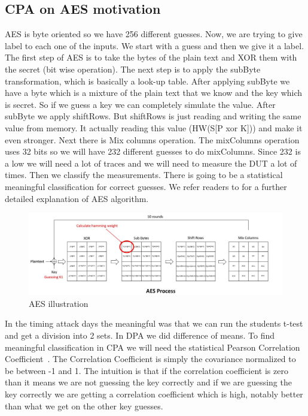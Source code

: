\subsection{CPA on AES motivation}

AES \cite{anderson1998serpent} is byte oriented so we have 256 different guesses. Now, we are trying to
give label to each one of the inputs. We start with a guess and then we give it
a label. The first step of AES is to take the bytes of the plain text and XOR
them with the secret (bit wise operation). The next step is to apply the subByte
transformation, which is basically a look-up table. After applying subByte we
have a byte which is a mixture of the plain text that we know and the key which
is secret. So if we guess a key we can completely simulate the value. After
subByte we apply shiftRows. But shiftRows is just reading and writing the same
value from memory. It actually reading this value (HW(S[P xor K])) and make it
even stronger. Next there is Mix columns operation. The mixColumns operation
uses 32 bits so we will have 232 different guesses to do mixColumns. Since 232
is a low we will need a lot of traces and we will need to measure the DUT a lot
of times. Then we classify the measurements. There is going to be a statistical
meaningful classification for correct guesses. We refer readers to \cite{AESDescription} 
for a further detailed explanation of AES algorithm.

\begin{figure}[!ht]
    \centering
    \includegraphics[width=1.0\textwidth]{images/chapter8/aes_process.jpg}
    \caption{AES illustration} \label{c8_aes:fig}
\end{figure}

In the timing attack days the meaningful was that we can run the students t-test
and get a division into 2 sets. In DPA we did  difference of means. To find
meaningful classification in CPA we will need the statistical Pearson
Correlation Coefficient~\cite{PearsonCorrelationCoefficient}. The Correlation
Coefficient is simply the covariance normalized to be between -1 and 1. The
intuition is that if the correlation coefficient is zero than it means we are
not guessing the key correctly and if we are guessing the key correctly we are
getting a correlation coefficient which is high, notably better than what we get
on the other key guesses. 

